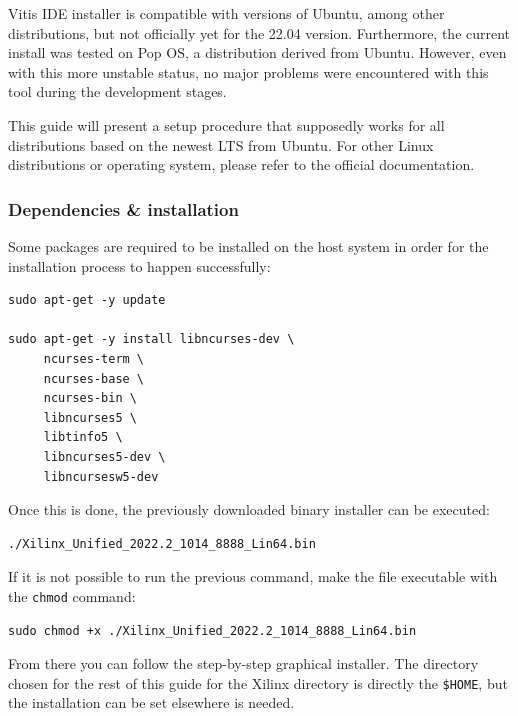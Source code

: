\documentclass[10pt]{article}
\begin{document}
Vitis IDE installer is compatible with versions of Ubuntu, among other distributions,
but not officially yet for the 22.04 version.
Furthermore, the current install was tested on Pop OS, a distribution derived from Ubuntu.
However, even with this more unstable status, no major problems were encountered
with this tool during the development stages.

This guide will present a setup procedure that supposedly works for all distributions based on the newest
LTS from Ubuntu. For other Linux distributions or operating system, please refer to the official documentation.

\subsubsection{Dependencies \& installation}
\label{sec:orgd1641ba}
Some packages are required to be installed on the host system
in order for the installation process to happen successfully:

\begin{verbatim}
sudo apt-get -y update

sudo apt-get -y install libncurses-dev \
     ncurses-term \
     ncurses-base \
     ncurses-bin \
     libncurses5 \
     libtinfo5 \
     libncurses5-dev \
     libncursesw5-dev
\end{verbatim}

Once this is done, the previously downloaded binary installer can be executed:

\begin{verbatim}
./Xilinx_Unified_2022.2_1014_8888_Lin64.bin
\end{verbatim}

If it is not possible to run the previous command, make the file executable with the \texttt{chmod} command:

\begin{verbatim}
sudo chmod +x ./Xilinx_Unified_2022.2_1014_8888_Lin64.bin
\end{verbatim}

From there you can follow the step-by-step graphical installer.
The directory chosen for the rest of this guide for the Xilinx directory
is directly the \texttt{\$HOME}, but the installation can be set elsewhere is needed.
\end{document}

